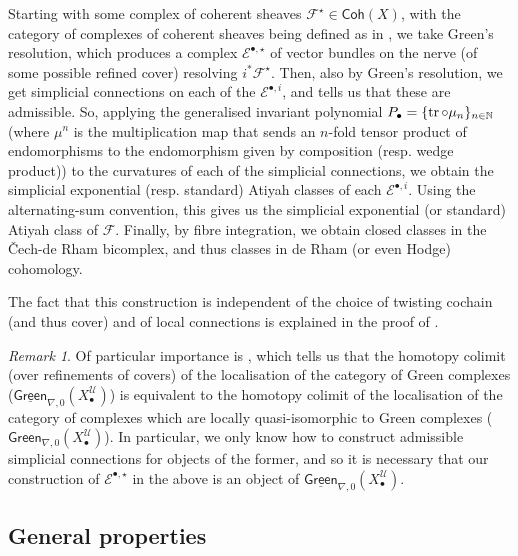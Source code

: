 \documentclass[11pt,fleqn]{article}
\theoremstyle{plain}
\theoremstyle{definition}
\theoremstyle{remark}
\newtheorem{remark}[theorem]{Remark}
\numberwithin{equation}{theorem}
\newcommand{\cover}{\mathcal{U}}
\newcommand{\anotherbullet}{\star}
\newcommand{\gcohX}{\mathsf{Coh}(X)}
\newcommand{\greenzeroX}{\mathsf{Green}_{\nabla,0}(X_\bullet^\cover)}
\newcommand{\sgreenzeroX}{\underline{\mathsf{Green}}_{\nabla,0}(X_\bullet^\cover)}
\begin{document}
        Starting with some complex of coherent sheaves $\mathscr{F}^\anotherbullet\in\gcohX$, with the category of complexes of coherent sheaves being defined as in \cite[§4.1]{Hosgood2020a}, we take Green's resolution, which produces a complex $\mathcal{E}^{\bullet,\anotherbullet}$ of vector bundles on the nerve (of some possible refined cover) resolving $i^*\mathscr{F}^\anotherbullet$.
        Then, also by Green's resolution, we get simplicial connections on each of the $\mathcal{E}^{\bullet,i}$, and \cite[Theorem~3.5.5]{Hosgood2020a} tells us that these are admissible.
        So, applying the generalised invariant polynomial $P_\bullet = \{\tr\circ\mu_n\}_{n\in\mathbb{N}}$ (where $\mu^n$ is the multiplication map that sends an $n$-fold tensor product of endomorphisms to the endomorphism given by composition (resp. wedge product)) to the curvatures of each of the simplicial connections, we obtain the simplicial exponential (resp. standard) Atiyah classes of each $\mathcal{E}^{\bullet,i}$.
        Using the alternating-sum convention, this gives us the simplicial exponential (or standard) Atiyah class of $\mathscr{F}$.
        Finally, by fibre integration, we obtain closed classes in the Čech-de Rham bicomplex, and thus classes in de Rham (or even Hodge) cohomology.

        The fact that this construction is independent of the choice of twisting cochain (and thus cover) and of local connections is explained in the proof of \cite[Theorem~2.4]{Green1980}.

        \begin{remark}
            Of particular importance is \cite[Lemma~4.2.13]{Hosgood2020a}, which tells us that the homotopy colimit (over refinements of covers) of the localisation of the category of Green complexes ($\sgreenzeroX$) is equivalent to the homotopy colimit of the localisation of the category of complexes which are locally quasi-isomorphic to Green complexes ($\greenzeroX$).
            In particular, we only know how to construct admissible simplicial connections for objects of the former, and so it is necessary that our construction of $\mathcal{E}^{\bullet,\anotherbullet}$ in the above is an object of $\sgreenzeroX$.
        \end{remark}


    \subsection{General properties}
\end{document}
